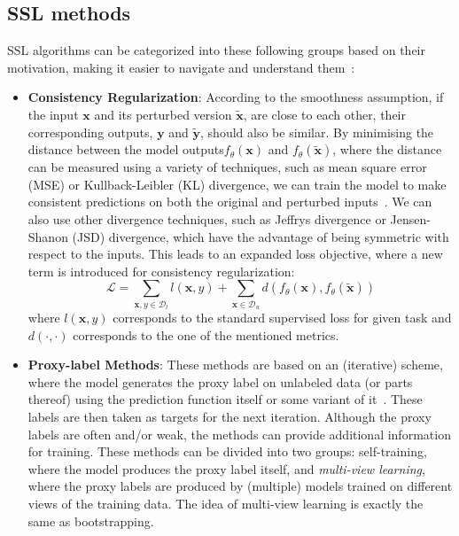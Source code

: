 \subsection{SSL methods}
SSL algorithms can be categorized into these following groups based on their motivation, making it easier to navigate and understand them~\cite{ssl-overview-2020}:
\begin{itemize}
        \item \textbf{Consistency Regularization}: According to the smoothness assumption, if the input $\mathbf{x}$ and its perturbed version $\tilde{\mathbf{x}}$, 
        are close to each other, their corresponding outputs, $\mathbf{y}$ and $\tilde{\mathbf{y}}$, should also be similar. By minimising the 
        distance between the model outputs$f_\theta(\mathbf{x})$ and $f_\theta(\tilde{\mathbf{x}})$, where the distance can be measured using 
        a variety of techniques, such as mean square error (MSE) or Kullback-Leibler (KL) divergence, we can train the model to make consistent
        predictions on both the original and perturbed inputs~\cite{temporal-ensembling-2017,regularization-&-pertrubations-2016}.
        We can also use other divergence techniques, such as Jeffrys divergence or Jensen-Shanon (JSD) divergence, which have the advantage of 
        being symmetric with respect to the inputs.  This leads to an expanded loss objective, where a new term is introduced for consistency 
        regularization:
        $$
        \mathcal{L} = \sum_{\mathbf{x},y \in \mathcal{D}_l}l(\mathbf{x},y) + \sum_{\mathbf{x} \in \mathcal{D}_u} d(f_\theta(\mathbf{x}),f_\theta(\tilde{\mathbf{x}}))
        $$
        where $l(\mathbf{x},y)$ corresponds to the standard supervised loss for given task and $d(\cdot,\cdot)$ corresponds to the one of the mentioned metrics. 

    \item \textbf{Proxy-label Methods}: These methods are based on an (iterative) scheme, where the model generates the proxy label on unlabeled data (or parts 
        thereof) using the prediction function itself or some variant of it~\cite{psuedo-label-2013}. These labels are then taken as targets for the next iteration.
        Although the proxy labels are often and/or weak, the methods can provide additional information for training. These methods can be divided into two groups: 
        self-training, where the model produces the proxy label itself, and \textit{multi-view learning}, where the proxy labels are produced by (multiple) models
        trained on different views of the training data. The idea of multi-view learning is exactly the same as bootstrapping.


\end{itemize}
